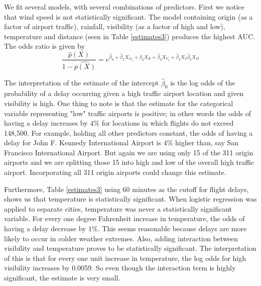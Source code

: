 \documentclass{asaproc}
\begin{document}
We fit several models, with several combinations of predictors. First we notice that wind speed is not statistically significant. The model containing origin (as a factor of airport traffic), rainfall, visibility (as a factor of high and low), temperature and distance (seen in Table \ref{estimates3}) produces the highest AUC. The odds ratio is given by
$$\frac{\hat{p}(X)}{1- \hat{p(X)}} = e^{\hat\beta_0 + \hat\beta_1 X_{O_f} + \hat\beta_2 X_R + \hat\beta_3 X_{V_f} +\hat\beta_4 X_T \hat\beta_5 X_D } $$

The interpretation of the estimate of the intercept $\hat\beta_0$ is the log odds of the probability of a delay occurring given a high traffic airport location and given visibility is high. One thing to note is that the estimate for the categorical variable representing "low" traffic airports is positive; in other words the odds of having a delay increases by  $4\%$ for locations in which flights do not exceed 148,500. For example, holding all other predictors constant, the odds of having a delay for John F. Kennedy International Airport  is $4\%$ higher than, say San Francisco International Airport. But again we are using only 15 of the 311 origin airports and we are splitting those 15 into high and low of the overall high traffic airport. Incorporating all 311 origin airports could change this estimate. 

Furthermore, Table \ref{estimates3} using 60 minutes as the cutoff for flight delays, shows us that temperature is statistically significant. When logistic regression was applied to separate cities, temperature was never a statistically significant variable. For every one degree Fahrenheit increase in temperature, the odds of having a delay decrease by $1\%$. This seems reasonable because delays are more likely to occur in colder weather extremes. Also, adding interaction between visibility and temperature proves to be statistically significant. The interpretation of this is that for every one unit increase in temperature, the log odds for high visibility increases by 0.0059. So even though the interaction term is highly significant, the estimate is very small.
\end{document}
